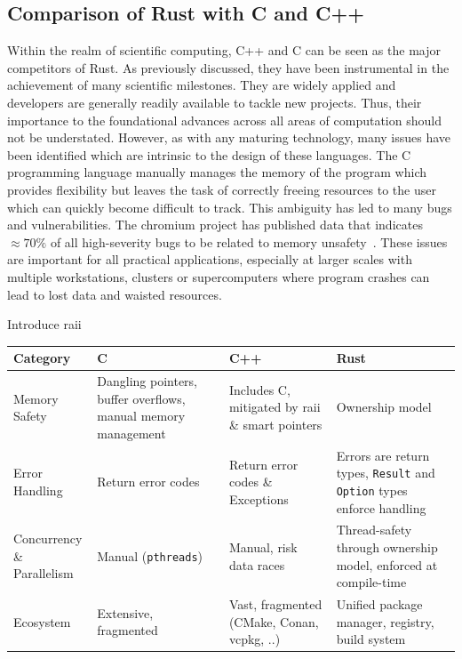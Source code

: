 \documentclass{article}
\begin{document}
\subsection{Comparison of Rust with C and C++}
Within the realm of scientific computing, C++ and C can be seen as the major competitors of Rust.
As previously discussed, they have been instrumental in the achievement of many scientific
milestones.
They are widely applied and developers are generally readily available to tackle new projects.
Thus, their importance to the foundational advances across all areas of computation should not be
understated.
However, as with any maturing technology, many issues have been identified which are intrinsic to
the design of these languages.
The C programming language manually manages the memory of the program which provides flexibility but
leaves the task of correctly freeing resources to the user which can quickly become difficult to
track.
This ambiguity has led to many bugs and vulnerabilities.
The chromium project has published data that indicates $\approx 70\%$ of all high-severity bugs to
be related to memory unsafety~\cite{ChromiumMemorySafety}.
These issues are important for all practical applications, especially at larger scales with
multiple workstations, clusters or supercomputers where program crashes can lead to lost data and
waisted resources.

Introduce \ac{raii}

\begin{table}
    \centering
    \begin{tabularx}{\textwidth}{X X X X}
        Category & C & C++ & Rust\\
        \midrule
        Memory Safety & Dangling pointers, buffer overflows, manual memory management & Includes C,
        mitigated by \ac{raii} \& smart pointers & Ownership model\\
        \midrule
        Error Handling & Return error codes & Return error codes \& Exceptions &
        Errors are return types, \texttt{Result} and \texttt{Option} types enforce handling\\
        \midrule
        \makecell[l]{Concurrency \&\\ Parallelism} & Manual (\texttt{pthreads})
        & Manual, risk data races &
        Thread-safety through ownership model, enforced at compile-time\\
        \midrule
        Ecosystem & Extensive, fragmented & Vast, fragmented (CMake, Conan, vcpkg, ..) & Unified
        package manager, registry, build system\\
    \end{tabularx}
\end{table}
\end{document}
